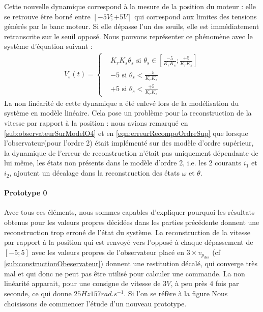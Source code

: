 			
		Cette nouvelle dynamique correspond à la mesure de la position du moteur : elle se retrouve être borné entre $[-5V; +5V]$ qui correspond aux limites des tensions générés par le banc moteur. Si elle dépasse l'un des seuils, elle est immédiatement retranscrite sur le seuil opposé. Nous pouvons représenter ce phénomène avec le système d'équation suivant :
		\begin{align*}
		V_s(t) = \left\lbrace \begin{aligned}
		&K_rK_s\theta_s \text{ si } \theta_s \in \left[\frac{-5}{K_rK_s}; \frac{+5}{K_rK_s}\right]\\
		&-5 \text{ si } \theta_s < \frac{-5}{K_rK_s}\\
		&+5 \text{ si } \theta_s < \frac{+5}{K_rK_s}
		\end{aligned}
		\right.		
		\end{align*}
		La non linéarité de cette dynamique a été enlevé lors de la modélisation du système en modèle linéaire. Cela pose un problème pour la reconstruction de la vitesse par rapport à la position : nous avions remarqué en \ref{sub:observateurSurModelO4} et en \ref{eqn:erreurRecompoOrdreSup} que lorsque l'observateur(pour l'ordre 2) était implémenté sur des modèle d'ordre supérieur, la dynamique de l'erreur de reconstruction n'était pas uniquement dépendante de lui même, les états non présents dans le modèle d'ordre 2, i.e. les 2 courants $i_1$ et $i_2$, ajoutent un décalage dans la reconstruction des états $\omega$ et $\theta$.
		
\paragraph{Prototype 0}			
Avec tous ces éléments, nous sommes capables d'expliquer pourquoi les résultats obtenus pour les valeurs propres décidées dans les parties précédente donnent une reconstruction trop erroné de l'état du système. La reconstruction de la vitesse par rapport à la position qui est renvoyé vers l'opposé à chaque dépassement de $[-5;5]$ avec les valeurs propres de l'observateur placé en $3\times v_{p_{des}}$ (cf \ref{sub:constructionObeservateur}) donnent une restitution décalé, qui converge très mal et qui donc ne peut pas être utilisé pour calculer une commande. La non linéarité apparait, pour une consigne de vitesse de $3V$, à peu près 4 fois par seconde, ce qui donne $25Hz157rad.s^{-1}$. Si l'on se réfère à la figure  Nous choisissons de commencer l'étude d'un nouveau prototype.

